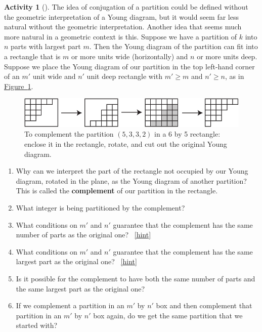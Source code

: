 \documentclass[10pt,]{book}
\newcommand{\terminology}[1]{\textbf{#1}}
\theoremstyle{plain}
\theoremstyle{definition}
\theoremstyle{definition}
\theoremstyle{definition}
\newtheorem{activity}[project]{Activity}
\numberwithin{equation}{chapter}
\begin{document}
\begin{activity}[]\label{activity-246}
\hypertarget{p-1107}{}%
The idea of conjugation of a partition could be defined without the geometric interpretation of a Young diagram, but it would seem far less natural without the geometric interpretation. Another idea that seems much more natural in a geometric context is this. Suppose we have a partition of \(k\) into \(n\) parts with largest part \(m\). Then the Young diagram of the partition can fit into a rectangle that is \(m\) or more units wide (horizontally) and \(n\) or more units deep. Suppose we place the Young diagram of our partition in the top left-hand corner of an \(m'\) unit wide and \(n'\) unit deep rectangle with \(m'\ge m\) and \(n' \ge n\), as in \hyperref[complementpartition]{Figure~\ref{complementpartition}}.%
\begin{figure}
\centering
\includegraphics[width=0.7\linewidth]{images/complementpartition}
\caption{To complement the partition \((5,3,3,2)\) in a 6 by 5 rectangle: enclose it in the rectangle, rotate, and cut out the original Young diagram.\label{complementpartition}}
\end{figure}
\begin{enumerate}[font=\bfseries,label=(\alph*),ref=\alph*]
\item\label{task-194} \hypertarget{p-1108}{}%
Why can we interpret the part of the rectangle not occupied by our Young diagram, rotated in the plane, as the Young diagram of another partition? This is called the \terminology{complement} of our partition in the rectangle.%
\item\label{task-195} \hypertarget{p-1110}{}%
What integer is being partitioned by the complement?%
\item\label{task-196} \hypertarget{p-1112}{}%
What conditions on \(m'\) and \(n'\) guarantee that the complement has the same number of parts as the original one?%
~\hfill{\tiny\hyperlink{a-246.c}{[hint]}\hypertarget{q-246.c}{}}\item\label{task-197} \hypertarget{p-1115}{}%
What conditions on \(m'\) and \(n'\) guarantee that the complement has the same largest part as the original one?%
~\hfill{\tiny\hyperlink{a-246.d}{[hint]}\hypertarget{q-246.d}{}}\item\label{task-198} \hypertarget{p-1118}{}%
Is it possible for the complement to have both the same number of parts and the same largest part as the original one?%
\item\label{task-199} \hypertarget{p-1120}{}%
If we complement a partition in an \(m'\) by \(n'\) box and then complement that partition in an \(m'\) by \(n'\) box again, do we get the same partition that we started with?%
\end{enumerate}
\end{activity}
\end{document}
